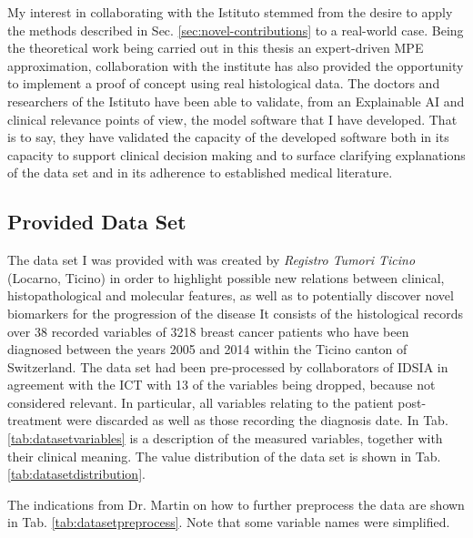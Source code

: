 
My interest in collaborating with the Istituto stemmed from the desire to apply the methods described in Sec. \ref{sec:novel-contributions} to a real-world case.
Being the theoretical work being carried out in this thesis an expert-driven MPE approximation, collaboration with the institute has also provided the opportunity to implement a proof of concept using real histological data.
The doctors and researchers of the Istituto have been able to validate, from an Explainable AI and clinical relevance points of view, the model software that I have developed.
That is to say, they have validated the capacity of the developed software both in its capacity to support clinical decision making and to surface clarifying explanations of the data set and in its adherence to established medical literature.


\subsection{Provided Data Set}
The data set I was provided with was created by \textit{Registro Tumori Ticino} (Locarno, Ticino) in order to highlight possible new relations between clinical, histopathological and molecular features, as well as to potentially discover novel biomarkers for the progression of the disease 
It consists of the histological records over 38 recorded variables of 3218 breast cancer patients who have been diagnosed between the years 2005 and 2014 within the Ticino canton of Switzerland.
The data set had been pre-processed by collaborators of IDSIA in agreement with the ICT with 13 of the variables being dropped, because not considered relevant.
In particular, all variables relating to the patient post-treatment were discarded as well as those recording the diagnosis date.
In Tab. \ref{tab:datasetvariables} is a description of the measured variables, together with their clinical meaning.
The value distribution of the data set is shown in Tab. \ref{tab:datasetdistribution}.

The indications from Dr. Martin on how to further preprocess the data are shown in Tab. \ref{tab:datasetpreprocess}.
Note that some variable names were simplified.

